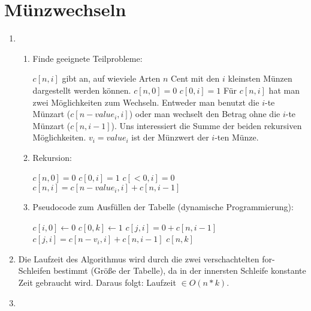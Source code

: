 \documentclass[a4paper,10pt]{scrartcl}
\begin{document}
\section{Münzwechseln}
\begin{enumerate}
 \item 

  \begin{enumerate}
  \item Finde geeignete Teilprobleme:
    
  $c[n,i]$ gibt an, auf wieviele Arten $n$ Cent mit den $i$ kleinsten Münzen dargestellt werden können. \newline
  $c[n, 0] = 0$ \newline
  $c[0, i] = 1$ \newline
  Für $c[n, i]$ hat man zwei Möglichkeiten zum Wechseln. Entweder man benutzt die $i$-te Münzart ($c[n - value_i, i]$) oder man wechselt den Betrag ohne die $i$-te Münzart ($c[n, i - 1]$).
  Uns interessiert die Summe der beiden rekursiven Möglichkeiten. $v_i = value_i$ ist der Münzwert der $i$-ten Münze.
  \item Rekursion:

  $c[n, 0] = 0$ \newline
  $c[0, i] = 1$ \newline
   $c[< 0, i] = 0$ \newline
  $c[n, i] = c[n - value_i, i] + c[n, i - 1]$
  \item Pseudocode zum Ausfüllen der Tabelle (dynamische Programmierung):

  \begin{algorithmic}
      \STATE $c[i, 0] \gets 0$
   \ENDFOR
      \STATE $c[0,k] \gets 1$
    \ENDFOR
	\STATE $c[j, i] = 0 + c[n, i - 1]$
      \ELSE
	\STATE $c[j, i] = c[n - v_i, i] + c[n, i - 1]$
      \ENDIF
    \ENDFOR
  \ENDFOR
  \RETURN $c[n,k]$
  \end{algorithmic}

  \end{enumerate}

 \item Die Laufzeit des Algorithmus wird durch die zwei verschachtelten for-Schleifen bestimmt (Größe der Tabelle), da in der innersten Schleife konstante Zeit gebraucht wird.
  Daraus folgt: Laufzeit $\in O(n*k)$.
 \item
  
\end{enumerate}
\end{document}
